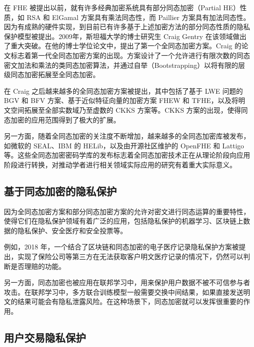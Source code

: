 在 FHE 被提出以前，就有许多经典加密系统具有部分同态加密（Partial HE）性质，如 RSA 和 ElGamal 方案具有乘法同态性\cite{rivest1978method,elgamal1985public}，而 Paillier 方案具有加法同态性\cite{paillier1999public}。因为有成熟的硬件实现，到目前已有许多基于上述加密方法的部分同态性质的隐私保护模型被提出。2009年，斯坦福大学的博士研究生 Craig Gentry 在该领域做出了重大突破。在他的博士学位论文中，提出了第一个全同态加密方案\cite{homenc}。Craig 的论文标志着第一代全同态加密方案的出现。方案设计了一个允许进行有限次数的同态密文加法和乘法的类同态加密算法，并通过自举（Bootstrapping）以将有限的层级同态加密拓展至全同态加密。

在 Craig 之后越来越多的全同态加密方案被提出，其中包括了基于 LWE 问题的 BGV 和 BFV 方案\cite{cryptoeprint:2011/344,cryptoeprint:2011/277,cryptoeprint:2012/144}、基于近似特征向量的加密方案 FHEW 和 TFHE\cite{fhew,TFHE}，以及将明文空间拓展至全部实数域乃至虚数的 CKKS\cite{cryptoeprint:2016/421} 方案等。CKKS 方案的出现，使得同态加密的应用范围得到了极大的扩展。

另一方面，随着全同态加密的关注度不断增加，越来越多的全同态加密库被发布，如微软的 SEAL\cite{sealcrypto}、IBM 的 HELib，以及由开源社区维护的 OpenFHE\cite{OpenFHE} 和 Lattigo\cite{Mouchet2020LattigoAM} 等。这些全同态加密密码学库的发布标志着全同态加密技术正在从理论阶段向应用阶段进行转换\cite{ZQL-SEAL}，对推动学者进行相关领域实际应用的研究有着重大实际意义。

\subsection{基于同态加密的隐私保护}

因为全同态加密方案和部分同态加密方案的允许对密文进行同态运算的重要特性，使得它们在隐私保护领域有着广泛的应用，包括隐私保护的机器学习、区块链上数据的隐私保护、安全医疗和安全投票等。

例如，2018 年，一个结合了区块链和同态加密的电子医疗记录隐私保护方案被提出\cite{Homo_Medi}，实现了保险公司等第三方在无法获取客户明文医疗记录的情况下，仍然可以判断是否理赔的功能。

另一方面，同态加密也被应用在联邦学习中，用来保护用户数据不被不可信参与者攻击。\cite{FL_HE}在联邦学习中，多方联合训练模型一般需要交换中间结果，如果直接发送明文的结果可能会有隐私泄露风险。在这种场景下，同态加密就可以发挥很重要的作用。

\subsection{用户交易隐私保护}

